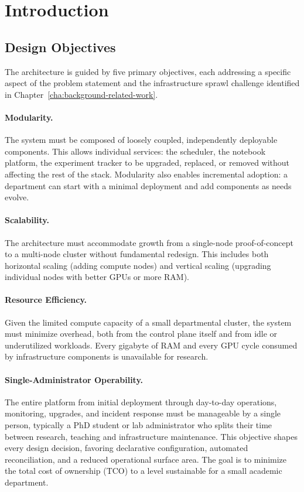 \section{Introduction}
\subsection{Design Objectives}

The architecture is guided by five primary objectives, each addressing a specific aspect of the problem statement and the infrastructure sprawl challenge identified in Chapter~\ref{cha:background-related-work}.

\paragraph{Modularity.} The system must be composed of loosely coupled, independently deployable components. This allows individual services: the scheduler, the notebook platform, the experiment tracker to be upgraded, replaced, or removed without affecting the rest of the stack. Modularity also enables incremental adoption: a department can start with a minimal deployment and add components as needs evolve.

\paragraph{Scalability.} The architecture must accommodate growth from a single-node proof-of-concept to a multi-node cluster without fundamental redesign. This includes both horizontal scaling (adding compute nodes) and vertical scaling (upgrading individual nodes with better GPUs or more RAM).

\paragraph{Resource Efficiency.} Given the limited compute capacity of a small departmental cluster, the system must minimize overhead, both from the control plane itself and from idle or underutilized workloads. Every gigabyte of RAM and every GPU cycle consumed by infrastructure components is unavailable for research.

\paragraph{Single-Administrator Operability.} The entire platform from initial deployment through day-to-day operations, monitoring, upgrades, and incident response must be manageable by a single person, typically a PhD student or lab administrator who splits their time between research, teaching and infrastructure maintenance. This objective shapes every design decision, favoring declarative configuration, automated reconciliation, and a reduced operational surface area. The goal is to minimize the total cost of ownership (TCO) to a level sustainable for a small academic department.

